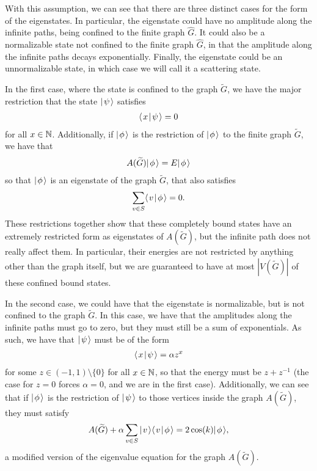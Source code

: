 \documentclass[../thesis-main/thesis-main]{subfiles}
\begin{document}
With this assumption, we can see that there are three distinct cases for the form of the eigenstates.  In particular, the eigenstate could have no amplitude along the infinite paths, being confined to the finite graph $\widehat{G}$.  It could also be a normalizable state not confined to the finite graph $\widehat{G}$, in that the amplitude along the infinite paths decays exponentially.  Finally, the eigenstate could be an unnormalizable state, in which case we will call it a scattering state.

In the first case, where the state is confined to the graph $\widetilde{G}$, we have the major restriction that the state $|\mspace{2mu} \psi \mspace{2mu} \rangle$ satisfies 
\begin{align}
  \langle\mspace{2mu} x \mspace{2mu} | \mspace{2mu} \psi\mspace{2mu} \rangle = 0
\end{align}
for all $x\in \mathbb{N}$.  Additionally, if $|\mspace{2mu} \phi \mspace{2mu} \rangle$ is the restriction of $|\mspace{2mu} \phi \mspace{2mu} \rangle$ to the finite graph $\widetilde{G}$, we have that 
\begin{align}
  A(\widetilde{G}) |\mspace{2mu} \phi \mspace{2mu} \rangle = E |\mspace{2mu} \phi \mspace{2mu} \rangle
\end{align}
so that $|\mspace{2mu} \phi \mspace{2mu} \rangle$ is an eigenstate of the graph $\widetilde{G}$, that also satisfies
\begin{align}
  \sum_{v\in S} \langle\mspace{2mu} v \mspace{2mu} | \mspace{2mu} \phi\mspace{2mu} \rangle = 0.
\end{align}
These restrictions together show that these completely bound states have an extremely restricted form as eigenstates of $A(\widetilde{G})$, but the infinite path does not really affect them.  In particular, their energies are not restricted by anything other than the graph itself, but we are guaranteed to have at most $|V(\widetilde{G})|$ of these confined bound states.

In the second case, we could have that the eigenstate is normalizable, but is not confined to the graph $\widetilde{G}$.  In this case, we have that the amplitudes along the infinite paths must go to zero, but they must still be a sum of exponentials.  As such, we have that $|\mspace{2mu} \psi \mspace{2mu} \rangle$ must be of the form
\begin{align}
  \langle\mspace{2mu} x \mspace{2mu} | \mspace{2mu} \psi\mspace{2mu} \rangle = \alpha z^x
\end{align} 
for some $z\in (-1,1)\setminus \{0\}$ for all $x\in \mathbb{N}$, so that the energy must be $z+ z^{-1}$ (the case for $z= 0$ forces $\alpha = 0$, and we are in the first case).  Additionally, we can see that if $|\mspace{2mu} \phi \mspace{2mu} \rangle$ is the restriction of $|\mspace{2mu} \psi \mspace{2mu} \rangle$ to those vertices inside the graph $A(\widetilde{G})$, they must satisfy
\begin{align}
  A(\widetilde{G}) + \alpha \sum_{v\in S} |\mspace{2mu} v \mspace{2mu} \rangle\langle\mspace{2mu} v \mspace{2mu} | \mspace{2mu} \phi\mspace{2mu} \rangle = 2 \cos (k) |\mspace{2mu} \phi \mspace{2mu} \rangle,
\end{align}
a modified version of the eigenvalue equation for the graph $A(\widetilde{G})$.
\end{document}
